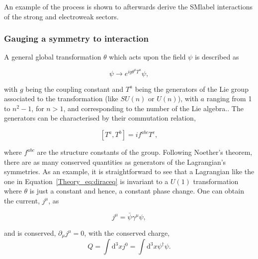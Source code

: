 An example of the process is shown to afterwards derive the \acrshort{SMlabel} interactions of the strong and electroweak sectors. 

\subsubsection{Gauging a symmetry to interaction}

A general global transformation $\theta$ which acts upon the field $\psi$ is described as

\begin{equation}
    \psi\rightarrow e^{ig\theta^aT^a}\psi,
\end{equation}

with $g$ being the coupling constant and $T^a$ being the generators of the Lie group associated to the transformation (like $SU(n)$ or $U(n)$), with $a$ ranging from 1 to $n^2-1$, for $n>1$, and corresponding to the number of the Lie algebra..
The generators can be characterised by their commutation relation, 

\begin{equation}
\label{Theory_eq:nonabcomutator}
    [T^a,T^b]=if^{abc}T^c,
\end{equation}

where $f^{abc}$ are the structure constants of the group. Following Noether's theorem, there are as many conserved quantities as generators of the Lagrangian's symmetries. As an example, it is straightforward to see that a Lagrangian like the one in
Equation~\ref{Theory_eq:diraceq} is invariant to a $U(1)$ transformation where $\theta$ is just a constant and hence, a constant phase change.
One can obtain the current, $j^\mu$, as

\begin{equation}
    j^\mu = \bar{\psi}\gamma^\mu\psi,
\end{equation}

and is conserved, $\partial_\mu j^\mu = 0$, with the conserved charge,
\begin{equation}
Q=\int \mathrm{d}^3x j^0 = \int \mathrm{d}^3x\psi^{\dag}\psi. %
\end{equation}



